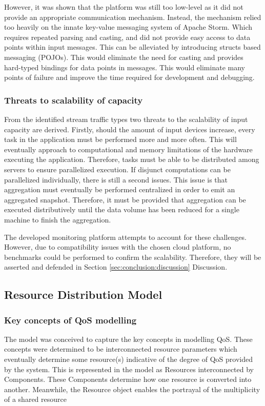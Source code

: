 However, it was shown that the platform was still too low-level as it did not provide an appropriate communication mechanism. Instead, the mechanism relied too heavily on the innate key-value messaging system of Apache Storm. Which requires repeated parsing and casting, and did not provide easy access to data points within input messages. This can be alleviated by introducing structs based messaging (POJOs). This would eliminate the need for casting and provides hard-typed bindings for data points in messages. This would eliminate many points of failure and improve the time required for development and debugging.

\subsubsection{Threats to scalability of capacity}
From the identified stream traffic types two threats to the scalability of input capacity are derived. Firstly, should the amount of input devices increase, every task in the application must be performed more and more often. This will eventually approach to computational and memory limitations of the hardware executing the application. Therefore, tasks must be able to be distributed among servers to ensure parallelized execution. If disjunct computations can be parallelized individually, there is still a second issues. This issue is that aggregation must eventually be performed centralized in order to emit an aggregated snapshot. Therefore, it must be provided that aggregation can be executed distributively until the data volume has been reduced for a single machine to finish the aggregation.

The developed monitoring platform attempts to account for these challenges. However, due to compatibility issues with the chosen cloud platform, no benchmarks could be performed to confirm the scalability. Therefore, they will be asserted and defended in Section \ref{sec:conclusion:discussion} Discussion.


\subsection{Resource Distribution Model}
\subsubsection{Key concepts of QoS modelling}
The model was conceived to capture the key concepts in modelling QoS. These concepts were determined to be interconnected resource parameters which eventually determine some resource(s) indicative of the degree of QoS provided by the system. This is represented in the model as Resources interconnected by Components. These Components determine how one resource is converted into another. Meanwhile, the Resource object enables the portrayal of the multiplicity of a shared resource

